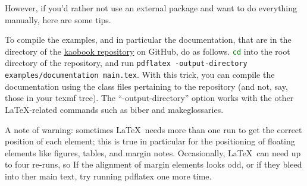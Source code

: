 However, if you'd rather not use an external package and want to do
everything manually, here are some tips.

To compile the examples, and in particular the documentation, that are
in the  directory of the
\href{https://github.com/fmarotta/kaobook}{kaobook repository} on
GitHub, do as follows. \lstinline[language=bash]|cd| into the root
directory of the repository, and run
\lstinline|pdflatex -output-directory examples/documentation main.tex|.
With this trick, you can compile the documentation using the class files
pertaining to the repository (and not, say, those in your texmf tree).
The \enquote{-output-directory} option works with the other
\LaTeX-related commands such as biber and makeglossaries.

A note of warning: sometimes \LaTeX\ needs more than one run to get the
correct position of each element; this is true in particular for the
positioning of floating elements like figures, tables, and margin notes.
Occasionally, \LaTeX\ can need up to four re-runs, so If the alignment
of margin elements looks odd, or if they bleed into ther main text, try
running pdflatex one more time.
